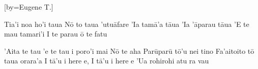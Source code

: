 [by={Eugene T.}]
\transpose{\shift}

\beginverse
Tia'i noa ho'i taua
N\={o} to taua 'utu\={a}fare
'Ia tam\={a}'a t\={a}ua
'Ia '\={a}parau t\={a}ua
'E te mau tamari'i
I te parau \={o} te fatu 
\endverse

\beginchorus
'Aita te tau 'e te tau i poro'i mai 
N\={o} te aha   
Par\={u}par\={u} t\={o}'u nei tino 
Fa'aitoito tō taua orara'a
I t\={a}'u i here e, I t\={a}'u i here e
'Ua rohirohi atu ra vau
\endchorus

\endsong
